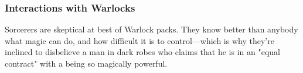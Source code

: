 \begin{multicols}{2}
\subsubsection{Interactions with Warlocks}
Sorcerers are skeptical at best of Warlock packs.
They know better than anybody what magic can do, and how difficult it is to control---which is why they're inclined to disbelieve a man in dark robes who claims that he is in an "equal contract" with a being so magically powerful.


\end{multicols}